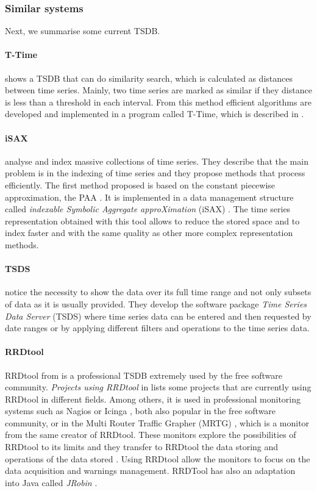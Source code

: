 \subsubsection{Similar systems}
Next, we summarise some current TSDB.

\paragraph{T-Time}  \textcite{assfalg08:thesis} shows a TSDB that can do similarity search, which is calculated as distances between time series. Mainly, two time series are marked as similar if they distance is less than a threshold in each interval. From this method efficient algorithms are developed and implemented in a program called T-Time, which is described in \cite{assfalg08:ttime}.

 
\paragraph{iSAX} \textcite{keogh08:isax,keogh10:isax} analyse and index massive collections of time series. They describe that the main problem is in the indexing of time series and they propose methods that process efficiently. The first method proposed is based on the constant piecewise approximation, the PAA \parencite{keogh00}. It is implemented in a data management structure called \emph{indexable Symbolic Aggregate approXimation} (iSAX) \parencite{isax}. The time series representation obtained with this tool allows to reduce the stored space and to index faster and with the same quality as other more complex representation methods.
 

\paragraph{TSDS} \textcite{weigel10} notice the necessity to show the data over its full time range and not only subsets of data as it is usually provided. 
They develop  the software package \emph{Time Series Data Server} (TSDS) \parencite{tsds} where time series data can be entered and then requested by date ranges or by applying different filters and operations to the time series data.


\paragraph{RRDtool} RRDtool from \textcite{rrdtool} is a professional TSDB extremely used by the free software community. \emph{Projects using RRDtool} in \cite{rrdtool} lists some projects that are currently using RRDtool in different fields. Among others, it is used in professional monitoring systems such as Nagios \parencite{nagios} or Icinga \parencite{icinga}, both also popular in the free software community, or  in the Multi Router Traffic Grapher (MRTG) \parencite{mrtg}, which is a monitor from the same creator of RRDtool. 
These monitors explore the possibilities of RRDtool to its limits and they transfer to RRDtool the data storing and operations of the data stored . 
Using RRDtool allow the monitors to focus on the data acquisition and warnings management. RRDTool has also an adaptation into Java called \emph{JRobin} \parencite{jrobin}.


